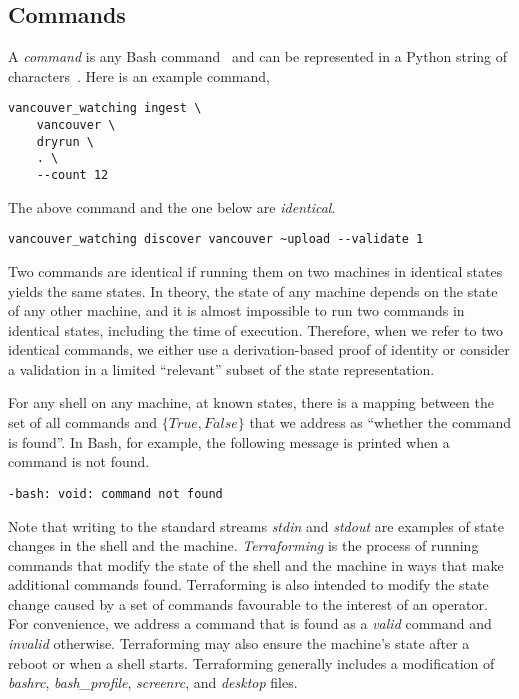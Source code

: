 \subsection{Commands}
\label{commands}

A \emph{command} is any Bash command~ and can be represented in a Python string of characters~. Here is an example command,
%
\begin{verbatim}
vancouver_watching ingest \
    vancouver \
    dryrun \
    . \
    --count 12
\end{verbatim}
%
The above command and the one below are \emph{identical}.
%
\begin{verbatim}
vancouver_watching discover vancouver ~upload --validate 1
\end{verbatim}
%
Two commands are identical if running them on two machines in identical states yields the same states. In theory, the state of any machine depends on the state of any other machine, and it is almost impossible to run two commands in identical states, including the time of execution. Therefore, when we refer to two identical commands, we either use a derivation-based proof of identity or consider a validation in a limited ``relevant'' subset of the state representation.

For any shell on any machine, at known states, there is a mapping between the set of all commands and $\{True,False\}$ that we address as ``whether the command is found''. In Bash, for example, the following message is printed when a command is not found.
%
\begin{verbatim}
-bash: void: command not found
\end{verbatim}
%
Note that writing to the standard streams \emph{stdin} and \emph{stdout} are examples of state changes in the shell and the machine. \emph{Terraforming} is the process of running commands that modify the state of the shell and the machine in ways that make additional commands found. Terraforming is also intended to modify the state change caused by a set of commands favourable to the interest of an operator. For convenience, we address a command that is found as a \emph{valid} command and \emph{invalid} otherwise. Terraforming may also ensure the machine's state after a reboot or when a shell starts. Terraforming generally includes a modification of \emph{bashrc}, \emph{bash\_profile}, \emph{screenrc}, and \emph{desktop} files.

